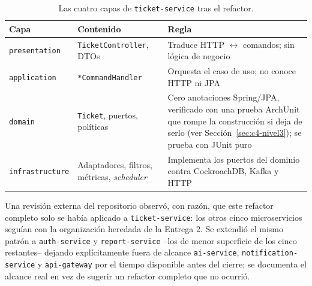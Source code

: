 \begin{table}[H]
\centering
\small
\caption{Las cuatro capas de \texttt{ticket-service} tras el refactor.}
\label{tab:capas-e4}
\begin{tabular}{@{}p{2.6cm}p{5.8cm}p{5.1cm}@{}}
\toprule
\textbf{Capa} & \textbf{Contenido} & \textbf{Regla} \\
\midrule
\texttt{presentation} & \texttt{TicketController}, DTOs & Traduce HTTP $\leftrightarrow$ comandos; sin lógica de negocio \\
\texttt{application} & \texttt{*CommandHandler} & Orquesta el caso de uso; no conoce HTTP ni JPA \\
\texttt{domain} & \texttt{Ticket}, puertos, políticas & Cero anotaciones Spring/JPA, verificado
  con una prueba ArchUnit que rompe la construcción si deja de serlo (ver
  Sección~\ref{sec:c4-nivel3}); se prueba con JUnit puro \\
\texttt{infrastructure} & Adaptadores, filtros, métricas, \emph{scheduler} & Implementa los puertos del dominio contra CockroachDB, Kafka y HTTP \\
\bottomrule
\end{tabular}
\end{table}

Una revisión externa del repositorio observó, con razón, que este refactor completo solo se
había aplicado a \texttt{ticket-service}: los otros cinco microservicios seguían con la
organización heredada de la Entrega 2. Se extendió el mismo patrón a \texttt{auth-service} y
\texttt{report-service} --los de menor superficie de los cinco restantes-- dejando
explícitamente fuera de alcance \texttt{ai-service}, \texttt{notification-service} y
\texttt{api-gateway} por el tiempo disponible antes del cierre; se documenta el alcance real en
vez de sugerir un refactor completo que no ocurrió.

